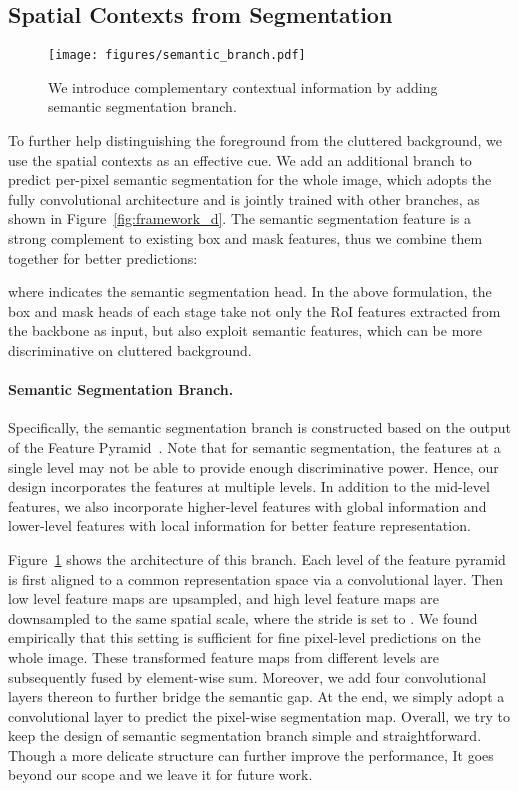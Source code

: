 \documentclass[10pt,twocolumn,letterpaper]{article}
\begin{document}
\subsection{Spatial Contexts from Segmentation}
\label{subsec:contexts}

\begin{figure}
	\centering
	\texttt{[image: figures/semantic\_branch.pdf]}
	\caption{We introduce complementary contextual information by adding semantic segmentation branch.}
	\label{fig:semantic-branch}
\end{figure}

To further help distinguishing the foreground from the cluttered background,
we use the spatial contexts as an effective cue.
We add an additional branch to predict per-pixel semantic segmentation for
the whole image, which adopts the fully convolutional architecture and is
jointly trained with other branches, as shown in Figure~\ref{fig:framework_d}.
The semantic segmentation feature is a strong complement to existing
box and mask features, thus we combine them together for better predictions:

where  indicates the semantic segmentation head.
In the above formulation, the box and mask heads of each stage take
not only the RoI features extracted from the backbone as input, but also
exploit semantic features, which can be more discriminative on cluttered
background.

\vspace{-7pt}
\paragraph{Semantic Segmentation Branch.}
Specifically, the semantic segmentation branch  is constructed
based on the output of the Feature Pyramid~\cite{lin2017feature}.
Note that for semantic segmentation, the features at a single level
may not be able to provide enough discriminative power. Hence,
our design incorporates the features at multiple levels.
In addition to the mid-level features, we also incorporate higher-level
features with global information and lower-level features with local information
for better feature representation.



Figure~\ref{fig:semantic-branch} shows the architecture of this branch.
Each level of the feature pyramid is first aligned to a common representation
space via a  convolutional layer.
Then low level feature maps are upsampled, and high level feature maps are
downsampled to the same spatial scale, where the stride is set to .
We found empirically that this setting is sufficient for fine pixel-level
predictions on the whole image.
These transformed feature maps from different levels are subsequently fused
by element-wise sum.
Moreover, we add four convolutional layers thereon to further bridge the
semantic gap.
At the end, we simply adopt a convolutional layer to predict the pixel-wise
segmentation map.
Overall, we try to keep the design of semantic segmentation branch simple
and straightforward.
Though a more delicate structure can further improve the performance,
It goes beyond our scope and we leave it for future work.
\end{document}
